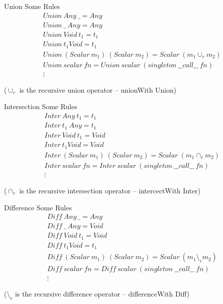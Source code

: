 \documentclass[12pt,t]{beamer}
\newcommand{\subt}[1]{{\footnotesize \color{subtitle} {#1}}}
\begin{document}
\begin{frame}{Union}
    \subt{Some Rules}
    \[
      \begin{array}{ll}
          & Union\ Any\ \_ = Any \\
          & Union\ \_\ Any = Any \\
          & Union\ Void\ t_1 = t_1 \\
          & Union\ t_1 Void = t_1 \\
          & Union\ (Scalar\ m_1)\ (Scalar\ m_2) = Scalar\ (m_1\cup_r m_2) \\
          & Union\ scalar\ fn = Union\ scalar\ (singleton\ \_\_call\_\_\ fn) \\
          & \vdots
    \end{array}
    \]

    \vfill
    \centering\tiny{($\cup_r$ is the recursive union operator -- unionWith Union)}
\end{frame}

\begin{frame}{Intersection}
    \subt{Some Rules}
    \[
      \begin{array}{ll}
          & Inter\ Any\ t_1 = t_1 \\
          & Inter\ t_1\ Any = t_1 \\
          & Inter\ Void\ t_1 = Void \\
          & Inter\ t_1 Void = Void \\
          & Inter\ (Scalar\ m_1)\ (Scalar\ m_2) = Scalar\ (m_1\cap_r m_2) \\
          & Inter\ scalar\ fn = Inter\ scalar\ (singleton\ \_\_call\_\_\ fn) \\
          & \vdots
    \end{array}
    \]

    \vfill
    \centering\tiny{($\cap_r$ is the recursive intersection operator -- intercectWith Inter)}
\end{frame}

\begin{frame}{Difference}
    \subt{Some Rules}
    \[
      \begin{array}{ll}
          & Diff\ Any\ \_ = Any \\
          & Diff\ \_\ Any = Void \\
          & Diff\ Void\ t_1 = Void \\
          & Diff\ t_1 Void = t_1 \\
          & Diff\ (Scalar\ m_1)\ (Scalar\ m_2) = Scalar\ (m_1\setminus_r m_2) \\
          & Diff\ scalar\ fn = Diff\ scalar\ (singleton\ \_\_call\_\_\ fn) \\
          & \vdots
    \end{array}
    \]

    \vfill
    \centering\tiny{($\setminus_r$ is the recursive difference operator -- differenceWith Diff)}
\end{frame}
\end{document}
